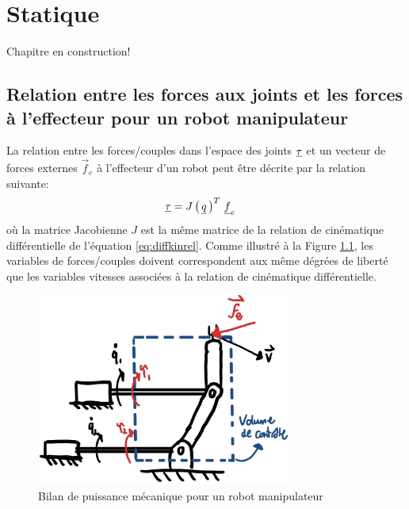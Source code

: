 \chapter{Statique}
\label{sec:static}

Chapitre en construction!

\section{Relation entre les forces aux joints et les forces à l'effecteur pour un robot manipulateur}
\label{sec:manipstatic}

La relation entre les forces/couples dans l'espace des joints $\underline{\tau}$ et un vecteur de forces externes $\vec{f}_e$ à l'effecteur d'un robot peut être décrite par la relation suivante:
\begin{align}
\underline{\tau} &= J\left( \, \underline{q} \, \right)^T \, \underline{f}_e 
\label{eq:staticmanipulator}
\end{align}
où la matrice Jacobienne $J$ est la même matrice de la relation de cinématique différentielle de l'équation \ref{eq:diffkinrel}. Comme illustré à la Figure \ref{fig:controlvolume}, les variables de forces/couples doivent correspondent aux même dégrées de liberté que les variables vitesses associées à la relation de cinématique différentielle. 
\begin{figure}[H]
	\centering
		\includegraphics[width=0.75\textwidth]{fig/controlvolume.jpg}
	\caption{Bilan de puissance mécanique pour un robot manipulateur}
	\label{fig:controlvolume}
\end{figure}

